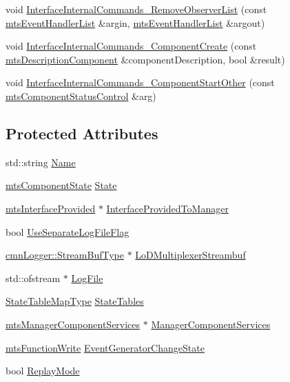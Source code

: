 \begin{DoxyCompactItemize}
\item 
void \hyperlink{classmts_component_a74c3b5c8d362b85ed84f36798aac7207}{Interface\+Internal\+Commands\+\_\+\+Remove\+Observer\+List} (const \hyperlink{classmts_event_handler_list}{mts\+Event\+Handler\+List} \&argin, \hyperlink{classmts_event_handler_list}{mts\+Event\+Handler\+List} \&argout)
\item 
void \hyperlink{classmts_component_a93427d2a73f3d1c2f965837a6eedc46d}{Interface\+Internal\+Commands\+\_\+\+Component\+Create} (const \hyperlink{classmts_description_component}{mts\+Description\+Component} \&component\+Description, bool \&result)
\item 
void \hyperlink{classmts_component_a1df33090eed7cbc805482227a46fa365}{Interface\+Internal\+Commands\+\_\+\+Component\+Start\+Other} (const \hyperlink{classmts_component_status_control}{mts\+Component\+Status\+Control} \&arg)
\end{DoxyCompactItemize}
\subsection*{Protected Attributes}
\begin{DoxyCompactItemize}
\item 
std\+::string \hyperlink{classmts_component_a506cd73bf8afc8286ddf8d933b1b1658}{Name}
\item 
\hyperlink{classmts_component_state}{mts\+Component\+State} \hyperlink{classmts_component_ac5352257c71985bc22cfa81e87f7f445}{State}
\item 
\hyperlink{classmts_interface_provided}{mts\+Interface\+Provided} $\ast$ \hyperlink{classmts_component_a6f9323d126ef72b6c3803abe4864b759}{Interface\+Provided\+To\+Manager}
\item 
bool \hyperlink{classmts_component_a12390c92b351b911b723158e636a9e5a}{Use\+Separate\+Log\+File\+Flag}
\item 
\hyperlink{classcmn_logger_a7d192777882d1dc6bb48ceac0b4e65bb}{cmn\+Logger\+::\+Stream\+Buf\+Type} $\ast$ \hyperlink{classmts_component_a870d5405720c2b9fc95223a1723712fd}{Lo\+D\+Multiplexer\+Streambuf}
\item 
std\+::ofstream $\ast$ \hyperlink{classmts_component_a5174cc0d7c4802fb479c0d065b79052f}{Log\+File}
\item 
\hyperlink{classmts_component_afd25509fe46d10ebc7a53347aa21c4ec}{State\+Table\+Map\+Type} \hyperlink{classmts_component_abe07b3be754d3f14a8454b21f160b537}{State\+Tables}
\item 
\hyperlink{classmts_manager_component_services}{mts\+Manager\+Component\+Services} $\ast$ \hyperlink{classmts_component_ae405a53b19cda763738c768fc2e6d5b9}{Manager\+Component\+Services}
\item 
\hyperlink{classmts_function_write}{mts\+Function\+Write} \hyperlink{classmts_component_ab7019fec5126701863a90ce46c9617f9}{Event\+Generator\+Change\+State}
\item 
bool \hyperlink{classmts_component_a1415d1093295a997b52d7c9d026fb5cc}{Replay\+Mode}
\end{DoxyCompactItemize}
